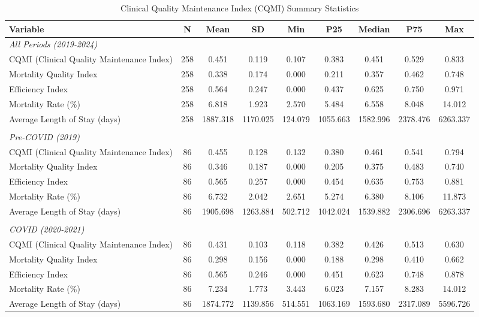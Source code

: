 \begin{table}[htbp]
\centering
\caption{Clinical Quality Maintenance Index (CQMI) Summary Statistics}
\label{tab:cqmi_summary}
\begin{tabular}{lcccccccc}
\hline\hline
Variable & N & Mean & SD & Min & P25 & Median & P75 & Max \\
\hline
\multicolumn{9}{l}{\textit{All Periods (2019-2024)}} \\
CQMI (Clinical Quality Maintenance Index) & 258 & 0.451 & 0.119 & 0.107 & 0.383 & 0.451 & 0.529 & 0.833 \\
Mortality Quality Index & 258 & 0.338 & 0.174 & 0.000 & 0.211 & 0.357 & 0.462 & 0.748 \\
Efficiency Index & 258 & 0.564 & 0.247 & 0.000 & 0.437 & 0.625 & 0.750 & 0.971 \\
Mortality Rate (\%) & 258 & 6.818 & 1.923 & 2.570 & 5.484 & 6.558 & 8.048 & 14.012 \\
Average Length of Stay (days) & 258 & 1887.318 & 1170.025 & 124.079 & 1055.663 & 1582.996 & 2378.476 & 6263.337 \\
\\
\multicolumn{9}{l}{\textit{Pre-COVID (2019)}} \\
CQMI (Clinical Quality Maintenance Index) & 86 & 0.455 & 0.128 & 0.132 & 0.380 & 0.461 & 0.541 & 0.794 \\
Mortality Quality Index & 86 & 0.346 & 0.187 & 0.000 & 0.205 & 0.375 & 0.483 & 0.740 \\
Efficiency Index & 86 & 0.565 & 0.257 & 0.000 & 0.454 & 0.635 & 0.753 & 0.881 \\
Mortality Rate (\%) & 86 & 6.732 & 2.042 & 2.651 & 5.274 & 6.380 & 8.106 & 11.873 \\
Average Length of Stay (days) & 86 & 1905.698 & 1263.884 & 502.712 & 1042.024 & 1539.882 & 2306.696 & 6263.337 \\
\\
\multicolumn{9}{l}{\textit{COVID (2020-2021)}} \\
CQMI (Clinical Quality Maintenance Index) & 86 & 0.431 & 0.103 & 0.118 & 0.382 & 0.426 & 0.513 & 0.630 \\
Mortality Quality Index & 86 & 0.298 & 0.156 & 0.000 & 0.188 & 0.298 & 0.410 & 0.662 \\
Efficiency Index & 86 & 0.565 & 0.246 & 0.000 & 0.451 & 0.623 & 0.748 & 0.878 \\
Mortality Rate (\%) & 86 & 7.234 & 1.773 & 3.443 & 6.023 & 7.157 & 8.283 & 14.012 \\
Average Length of Stay (days) & 86 & 1874.772 & 1139.856 & 514.551 & 1063.169 & 1593.680 & 2317.089 & 5596.726 \\

\end{tabular}
\end{table}
